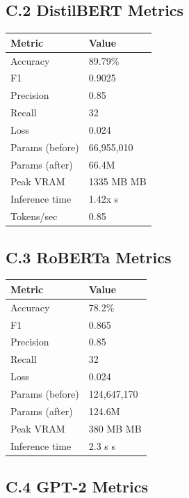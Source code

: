 \subsection{C.2 DistilBERT Metrics}

\begin{table}[H]
\centering
\small
\begin{tabular}{ll}
\toprule
\textbf{Metric} & \textbf{Value} \\
\midrule
Accuracy & 89.79\% \\
F1 & 0.9025 \\
Precision & 0.85 \\
Recall & 32 \\
Loss & 0.024 \\
Params (before) & 66,955,010 \\
Params (after) & 66.4M \\
Peak VRAM & 1335 MB MB \\
Inference time & 1.42x s \\
Tokens/sec & 0.85 \\
\bottomrule
\end{tabular}
\end{table}

\subsection{C.3 RoBERTa Metrics}

\begin{table}[H]
\centering
\small
\begin{tabular}{ll}
\toprule
\textbf{Metric} & \textbf{Value} \\
\midrule
Accuracy & 78.2\% \\
F1 & 0.865 \\
Precision & 0.85 \\
Recall & 32 \\
Loss & 0.024 \\
Params (before) & 124,647,170 \\
Params (after) & 124.6M \\
Peak VRAM & 380 MB MB \\
Inference time & 2.3 s s \\
\bottomrule
\end{tabular}
\end{table}

\subsection{C.4 GPT-2 Metrics}

